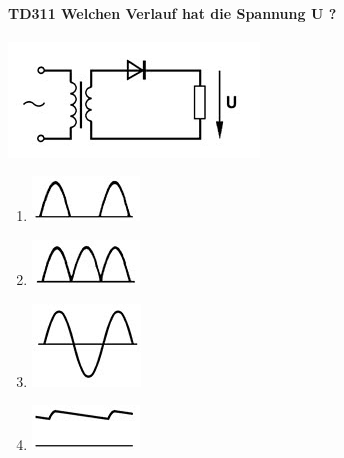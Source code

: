 \documentclass[8pt]{article}
\begin{document}
\begin{enumerate}
\begin{enumerate}[nolistsep,label=\Alph*]
\paragraph*{TD311 Welchen Verlauf hat die Spannung U ?}
\begin{center}
	\begin{minipage}{\linewidth}
		\centering
		\includegraphics[scale=1.0]{pics/td311_a.jpg}
	\end{minipage}
\end{center}
\begin{enumerate}[nolistsep,label=\Alph*]
\item
\begin{center}
	\begin{minipage}{\linewidth}
		\centering
		\includegraphics[scale=1.0]{pics/td311_b.jpg}
	\end{minipage}
\end{center}
\item
\begin{center}
	\begin{minipage}{\linewidth}
		\centering
		\includegraphics[scale=1.0]{pics/td311_c.jpg}
	\end{minipage}
\end{center}
\item
\begin{center}
	\begin{minipage}{\linewidth}
		\centering
		\includegraphics[scale=1.0]{pics/td311_d.jpg}
	\end{minipage}
\end{center}
\item
\begin{center}
	\begin{minipage}{\linewidth}
		\centering
		\includegraphics[scale=1.0]{pics/td311_e.jpg}
	\end{minipage}
\end{center}
\end{enumerate}


\end{enumerate}
\end{enumerate}
\end{document}
